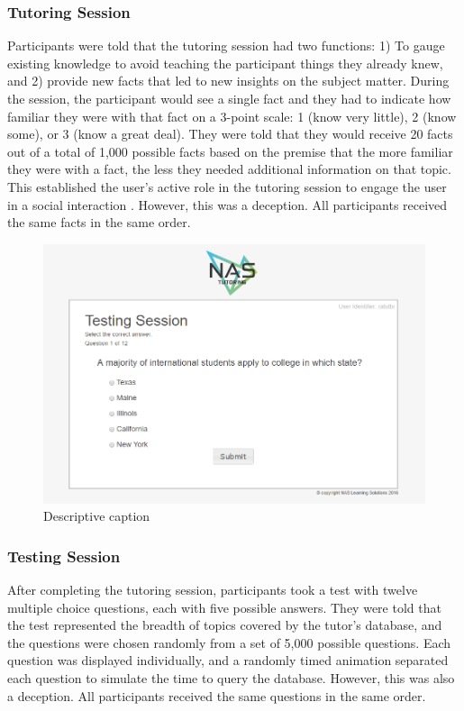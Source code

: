 \documentclass{sig-alternate-05-2015}
\begin{document}
\subsubsection{Tutoring Session}
Participants were told that the tutoring session had two functions: 1) To gauge existing knowledge to avoid teaching the participant things they already knew, and 2) provide new facts that led to new insights on the subject matter.  During the session, the participant would see a single fact and they had to indicate how familiar they were with that fact on a 3-point scale: 1 (know very little), 2 (know some), or 3 (know a great deal). They were told that they would receive 20 facts out of a total of 1,000 possible facts based on the premise that the more familiar they were with a fact, the less they needed additional information on that topic.  This established the user's active role in the tutoring session to engage the user in a social interaction \cite{nass1993voices}.  However, this was a deception.  All participants received the same facts in the same order.

\begin{figure}[!h]
    \includegraphics[width=\linewidth]{figures/website/06_testing.png}
    \caption{Descriptive caption}
\end{figure}

\subsubsection{Testing Session}
After completing the tutoring session, participants took a test with twelve multiple choice questions, each with five possible answers.  They were told that the test represented the breadth of topics covered by the tutor's database, and the questions were chosen randomly from a set of 5,000 possible questions.   Each question was displayed individually, and a randomly timed animation separated each question to simulate the time to query the database.  However, this was also a deception.  All participants received the same questions in the same order.  
\end{document}

